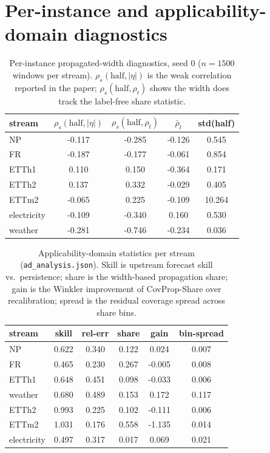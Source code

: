 \documentclass[10pt]{article}
\begin{document}
\section{Per-instance and applicability-domain diagnostics}
\begin{table}[h]\centering\small
\caption{Per-instance propagated-width diagnostics, seed 0 ($n{=}1500$ windows per stream).  $\rho_s(\mathrm{half},|\eta|)$ is the weak correlation reported in the paper; $\rho_s(\mathrm{half},\rho_t)$ shows the width does track the label-free share statistic.}
\begin{tabular}{lcccc}
\toprule
stream & $\rho_s(\mathrm{half},|\eta|)$ & $\rho_s(\mathrm{half},\rho_t)$ & $\bar\rho_t$ & std(half) \\
\midrule
NP & -0.117 & -0.285 & -0.126 & 0.545 \\
FR & -0.187 & -0.177 & -0.061 & 0.854 \\
ETTh1 & 0.110 & 0.150 & -0.364 & 0.171 \\
ETTh2 & 0.137 & 0.332 & -0.029 & 0.405 \\
ETTm2 & -0.065 & 0.225 & -0.109 & 10.264 \\
electricity & -0.109 & -0.340 & 0.160 & 0.530 \\
weather & -0.281 & -0.746 & -0.234 & 0.036 \\
\bottomrule
\end{tabular}
\end{table}
\begin{table}[h]\centering\small
\caption{Applicability-domain statistics per stream (\texttt{ad\_analysis.json}).  Skill is upstream forecast skill vs.\ persistence; share is the width-based propagation share; gain is the Winkler improvement of CovProp-Share over recalibration; spread is the residual coverage spread across share bins.}
\begin{tabular}{lccccc}
\toprule
stream & skill & rel-err & share & gain & bin-spread \\
\midrule
NP & 0.622 & 0.340 & 0.122 & 0.024 & 0.007 \\
FR & 0.465 & 0.230 & 0.267 & -0.005 & 0.008 \\
ETTh1 & 0.648 & 0.451 & 0.098 & -0.033 & 0.006 \\
weather & 0.680 & 0.489 & 0.153 & 0.172 & 0.117 \\
ETTh2 & 0.993 & 0.225 & 0.102 & -0.111 & 0.006 \\
ETTm2 & 1.031 & 0.176 & 0.558 & -1.135 & 0.014 \\
electricity & 0.497 & 0.317 & 0.017 & 0.069 & 0.021 \\
\bottomrule
\end{tabular}
\end{table}
\end{document}
